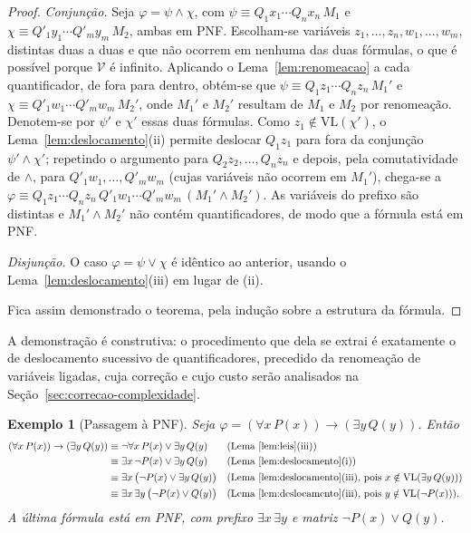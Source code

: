 \documentclass[12pt,a4paper,oneside]{report}
\theoremstyle{tituloplain}
\theoremstyle{titulodef}
\newtheorem{exemplo}[teorema]{Exemplo}
\begin{document}
\begin{proof}
\emph{Conjunção.} Seja $\varphi=\psi\wedge\chi$, com $\psi\equiv Q_1x_1\cdots Q_nx_n\,M_1$ e $\chi\equiv Q'_1y_1\cdots Q'_my_m\,M_2$, ambas em PNF. Escolham-se variáveis $z_1,\dots,z_n,w_1,\dots,w_m$, distintas duas a duas e que não ocorrem em nenhuma das duas fórmulas, o que é possível porque $\mathcal{V}$ é infinito. Aplicando o Lema~\ref{lem:renomeacao} a cada quantificador, de fora para dentro, obtém-se que $\psi\equiv Q_1z_1\cdots Q_nz_n\,M_1'$ e $\chi\equiv Q'_1w_1\cdots Q'_mw_m\,M_2'$, onde $M_1'$ e $M_2'$ resultam de $M_1$ e $M_2$ por renomeação. Denotem-se por $\psi'$ e $\chi'$ essas duas fórmulas. Como $z_1\notin\mathrm{VL}(\chi')$, o Lema~\ref{lem:deslocamento}(ii) permite deslocar $Q_1z_1$ para fora da conjunção $\psi'\wedge\chi'$; repetindo o argumento para $Q_2z_2,\dots,Q_nz_n$ e depois, pela comutatividade de $\wedge$, para $Q'_1w_1,\dots,Q'_mw_m$ (cujas variáveis não ocorrem em $M_1'$), chega-se a $\varphi\equiv Q_1z_1\cdots Q_nz_n\,Q'_1w_1\cdots Q'_mw_m\,(M_1'\wedge M_2')$. As variáveis do prefixo são distintas e $M_1'\wedge M_2'$ não contém quantificadores, de modo que a fórmula está em PNF.

\emph{Disjunção.} O caso $\varphi=\psi\vee\chi$ é idêntico ao anterior, usando o Lema~\ref{lem:deslocamento}(iii) em lugar de (ii).

Fica assim demonstrado o teorema, pela indução sobre a estrutura da fórmula.
\end{proof}

A demonstração é construtiva: o procedimento que dela se extrai é exatamente o de deslocamento sucessivo de quantificadores, precedido da renomeação de variáveis ligadas, cuja correção e cujo custo serão analisados na Seção~\ref{sec:correcao-complexidade}.

\begin{exemplo}[Passagem à PNF]\label{ex:pnf}
Seja $\varphi=(\forall x\,P(x))\rightarrow(\exists y\,Q(y))$. Então
\begin{align*}
(\forall x\,P(x))\rightarrow(\exists y\,Q(y))
&\equiv\neg\forall x\,P(x)\vee\exists y\,Q(y) &&\text{(Lema~\ref{lem:leis}(iii))}\\
&\equiv\exists x\,\neg P(x)\vee\exists y\,Q(y) &&\text{(Lema~\ref{lem:deslocamento}(i))}\\
&\equiv\exists x\,\bigl(\neg P(x)\vee\exists y\,Q(y)\bigr) &&\text{(Lema~\ref{lem:deslocamento}(iii), pois } x\notin\mathrm{VL}(\exists y\,Q(y)))\\
&\equiv\exists x\,\exists y\,\bigl(\neg P(x)\vee Q(y)\bigr) &&\text{(Lema~\ref{lem:deslocamento}(iii), pois } y\notin\mathrm{VL}(\neg P(x))).
\end{align*}
A última fórmula está em PNF, com prefixo $\exists x\,\exists y$ e matriz $\neg P(x)\vee Q(y)$.
\end{exemplo}
\end{document}
